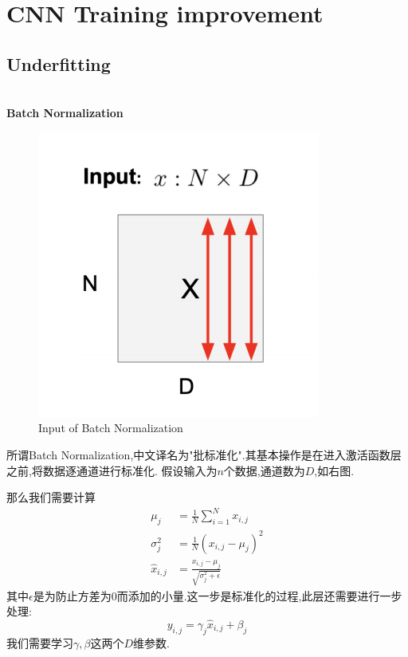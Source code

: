 \chapter{CNN Training improvement}

\section{Underfitting}

\textbf{\\Batch Normalization}

\begin{figure}%
	\includegraphics[scale=0.65]{figures/BNsize.png}
	\caption{Input of Batch Normalization}
	\label{Input of Batch Normalization}
\end{figure}

所谓Batch Normalization,中文译名为"批标准化".其基本操作是在进入激活函数层之前,将数据逐通道进行标准化.
假设输入为$n$个数据,通道数为$D$,如右图.

那么我们需要计算
\begin{equation}
	\begin{split}
		\mu_j &= \frac{1}{N} \sum_{i=1}^{N} x_{i, j}
		\\
		\sigma_j^2 &= \frac{1}{N} (x_{i, j} - \mu_j)^2
		\\
		\hat{x}_{i, j} &= \frac{x_{i, j} - \mu_j}{\sqrt{\sigma_j^2 + \epsilon}}
	\end{split}
	\label{BN calculation}
\end{equation}
其中$\epsilon$是为防止方差为$0$而添加的小量.这一步是标准化的过程,此层还需要进行一步处理:
\begin{equation}
	y_{i, j} = \gamma_{j} \hat{x}_{i,j} + \beta_j
\end{equation}
我们需要学习$\gamma, \beta$这两个$D$维参数.

